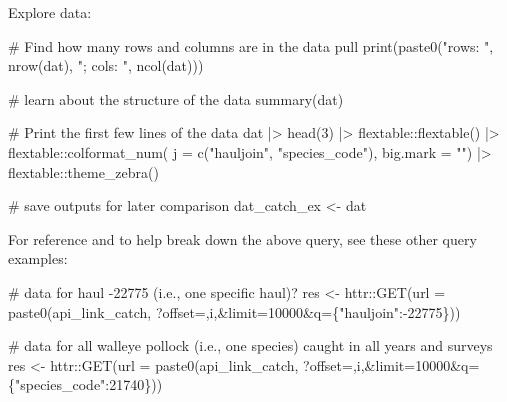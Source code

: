 \documentclass[
  letterpaper,
  oneside,
  open=any]{scrbook}
\newenvironment{Shaded}{\begin{snugshade}}{\end{snugshade}}
\newcommand{\AttributeTok}[1]{\textcolor[rgb]{0.40,0.45,0.13}{#1}}
\newcommand{\CommentTok}[1]{\textcolor[rgb]{0.37,0.37,0.37}{#1}}
\newcommand{\DecValTok}[1]{\textcolor[rgb]{0.68,0.00,0.00}{#1}}
\newcommand{\FunctionTok}[1]{\textcolor[rgb]{0.28,0.35,0.67}{#1}}
\newcommand{\NormalTok}[1]{\textcolor[rgb]{0.00,0.23,0.31}{#1}}
\newcommand{\OtherTok}[1]{\textcolor[rgb]{0.00,0.23,0.31}{#1}}
\newcommand{\SpecialCharTok}[1]{\textcolor[rgb]{0.37,0.37,0.37}{#1}}
\newcommand{\StringTok}[1]{\textcolor[rgb]{0.13,0.47,0.30}{#1}}
\begin{document}
Explore data:

\begin{Shaded}
\begin{Highlighting}[]
\CommentTok{\# Find how many rows and columns are in the data pull}
\FunctionTok{print}\NormalTok{(}\FunctionTok{paste0}\NormalTok{(}\StringTok{"rows: "}\NormalTok{, }\FunctionTok{nrow}\NormalTok{(dat), }\StringTok{"; cols: "}\NormalTok{, }\FunctionTok{ncol}\NormalTok{(dat)))}

\CommentTok{\# learn about the structure of the data}
\FunctionTok{summary}\NormalTok{(dat)}

\CommentTok{\# Print the first few lines of the data }
\NormalTok{dat }\SpecialCharTok{|\textgreater{}} 
  \FunctionTok{head}\NormalTok{(}\DecValTok{3}\NormalTok{) }\SpecialCharTok{|\textgreater{}} 
\NormalTok{  flextable}\SpecialCharTok{::}\FunctionTok{flextable}\NormalTok{() }\SpecialCharTok{|\textgreater{}}
\NormalTok{  flextable}\SpecialCharTok{::}\FunctionTok{colformat\_num}\NormalTok{(}
      \AttributeTok{j =} \FunctionTok{c}\NormalTok{(}\StringTok{"hauljoin"}\NormalTok{, }\StringTok{"species\_code"}\NormalTok{), }
      \AttributeTok{big.mark =} \StringTok{""}\NormalTok{) }\SpecialCharTok{|\textgreater{}} 
\NormalTok{  flextable}\SpecialCharTok{::}\FunctionTok{theme\_zebra}\NormalTok{()}

\CommentTok{\# save outputs for later comparison}
\NormalTok{dat\_catch\_ex }\OtherTok{\textless{}{-}}\NormalTok{ dat}
\end{Highlighting}
\end{Shaded}

For reference and to help break down the above query, see these other
query examples:

\begin{Shaded}
\begin{Highlighting}[]
\CommentTok{\# data for haul {-}22775 (i.e., one specific haul)?}
\NormalTok{res }\OtherTok{\textless{}{-}}\NormalTok{ httr}\SpecialCharTok{::}\FunctionTok{GET}\NormalTok{(}\AttributeTok{url =} \FunctionTok{paste0}\NormalTok{(api\_link\_catch, }
                              \StringTok{\textquotesingle{}?offset=\textquotesingle{}}\NormalTok{,i,}\StringTok{\textquotesingle{}\&limit=10000\&q=\{"hauljoin":{-}22775\}\textquotesingle{}}\NormalTok{))}

\CommentTok{\# data for all walleye pollock (i.e., one species) caught in all years and surveys}
\NormalTok{res }\OtherTok{\textless{}{-}}\NormalTok{ httr}\SpecialCharTok{::}\FunctionTok{GET}\NormalTok{(}\AttributeTok{url =} \FunctionTok{paste0}\NormalTok{(api\_link\_catch, }
                              \StringTok{\textquotesingle{}?offset=\textquotesingle{}}\NormalTok{,i,}\StringTok{\textquotesingle{}\&limit=10000\&q=\{"species\_code":21740\}\textquotesingle{}}\NormalTok{))}
\end{Highlighting}
\end{Shaded}
\end{document}
